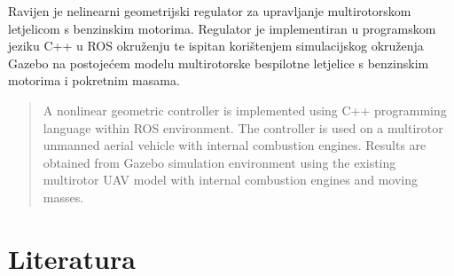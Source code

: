\documentclass[times, utf8, diplomski]{fer}
\begin{document}
\begin{sazetak}
Ravijen je nelinearni geometrijski regulator za upravljanje multirotorskom letjelicom s benzinskim motorima. Regulator je implementiran u programskom jeziku C++ u ROS okruženju te ispitan korištenjem simulacijskog okruženja Gazebo na postojećem modelu multirotorske bespilotne letjelice s benzinskim motorima i pokretnim masama.

\end{sazetak}

\begin{abstract}
A nonlinear geometric controller is implemented using C++ programming language within ROS environment. The controller is used on a multirotor unmanned aerial vehicle with internal combustion engines. Results are obtained from Gazebo simulation environment using the existing multirotor UAV model with internal combustion engines and moving masses.

\end{abstract}




\chapter{Literatura}
\end{document}
